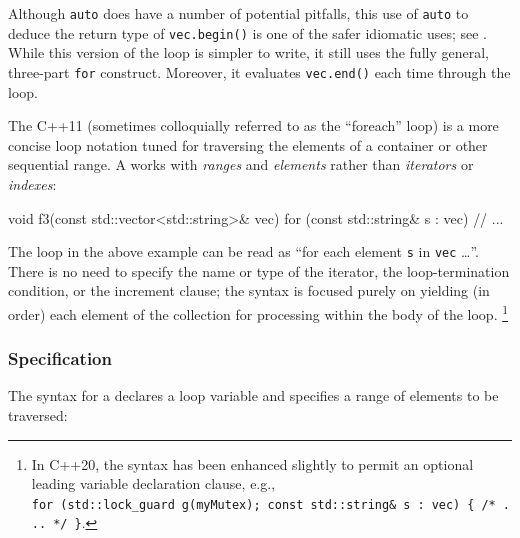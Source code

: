\noindent Although \lstinline!auto! does have a number of potential pitfalls, this
use of \lstinline!auto! to deduce the return type of \lstinline!vec.begin()!
is one of the safer idiomatic uses; see . While this
version of the loop is simpler to write, it still uses the fully
general, three-part \lstinline!for! construct. Moreover, it evaluates
\lstinline!vec.end()! each time through the loop.

The C++11  (sometimes colloquially
referred to as the ``foreach'' loop) is a more concise loop notation
tuned for traversing the elements of a container or other sequential
range. A  works with \emph{ranges}
and \emph{elements} rather than \emph{iterators} or \emph{indexes}:

\begin{emcppslisting}[label={iterating-over-std::vector-with-a-range-based-for-loop}]
void f3(const std::vector<std::string>& vec)
{
    for (const std::string& s : vec)
    {
        // ...
    }
}
\end{emcppslisting}
    

\noindent The loop in the above example can be read as ``for each element
\lstinline!s! in \lstinline!vec! \ldots''. There is no need to specify the
name or type of the iterator, the loop-termination condition, or the
increment clause; the syntax is focused purely on yielding (in order)
each element of the collection for processing within the body of the
loop. {\cprotect\footnote{In C++20, the syntax has been enhanced
slightly to permit an optional leading variable declaration clause,
e.g.,
  \lstinline!for!~\lstinline!(std::lock_guard!~\lstinline!g(myMutex);!~\lstinline!const!~\lstinline!std::string&!~\lstinline!s!~\lstinline!:!~\lstinline!vec)!~\lstinline!{!~\lstinline!/*!~\lstinline!...!~\lstinline!*/!~\lstinline!}!.}}

\subsubsection[Specification]{Specification}\label{specification}

The syntax for a  declares a loop
variable and specifies a range of elements to be traversed:

